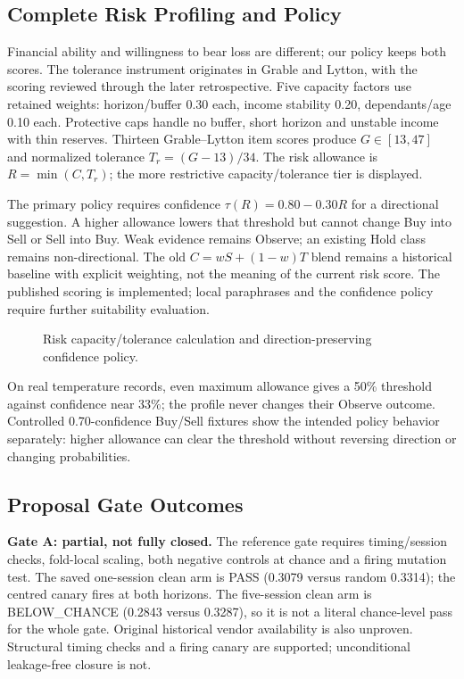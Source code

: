 \subsection{Complete Risk Profiling and Policy}

Financial ability and willingness to bear loss are different\cite{finra_risk_tolerance}; our policy keeps both scores. The tolerance instrument originates in Grable and Lytton\cite{grable_lytton_1999}, with the scoring reviewed through the later retrospective\cite{grable_retrospective_2015}. Five capacity factors use retained weights: horizon/buffer 0.30 each, income stability 0.20, dependants/age 0.10 each. Protective caps handle no buffer, short horizon and unstable income with thin reserves. Thirteen Grable--Lytton item scores produce $G\in[13,47]$ and normalized tolerance $T_r=(G-13)/34$. The risk allowance is $R=\min(C,T_r)$; the more restrictive capacity/tolerance tier is displayed.

The primary policy requires confidence $\tau(R)=0.80-0.30R$ for a directional suggestion. A higher allowance lowers that threshold but cannot change Buy into Sell or Sell into Buy. Weak evidence remains Observe; an existing Hold class remains non-directional. The old $C=wS+(1-w)T$ blend remains a historical baseline with explicit weighting, not the meaning of the current risk score. The published scoring is implemented; local paraphrases and the confidence policy require further suitability evaluation.
\begin{figure}[htbp]\centering\caption{Risk capacity/tolerance calculation and direction-preserving confidence policy.}\label{fig:risk-flow}\end{figure}

On real temperature records, even maximum allowance gives a 50\% threshold against confidence near 33\%; the profile never changes their Observe outcome. Controlled 0.70-confidence Buy/Sell fixtures show the intended policy behavior separately: higher allowance can clear the threshold without reversing direction or changing probabilities.
\subsection{Proposal Gate Outcomes}
\label{sec:gates}
\textbf{Gate A: partial, not fully closed.} The reference gate requires timing/session checks, fold-local scaling, both negative controls at chance and a firing mutation test. The saved one-session clean arm is PASS (0.3079 versus random 0.3314); the centred canary fires at both horizons. The five-session clean arm is BELOW\_CHANCE (0.2843 versus 0.3287), so it is not a literal chance-level pass for the whole gate. Original historical vendor availability is also unproven. Structural timing checks and a firing canary are supported; unconditional leakage-free closure is not.

